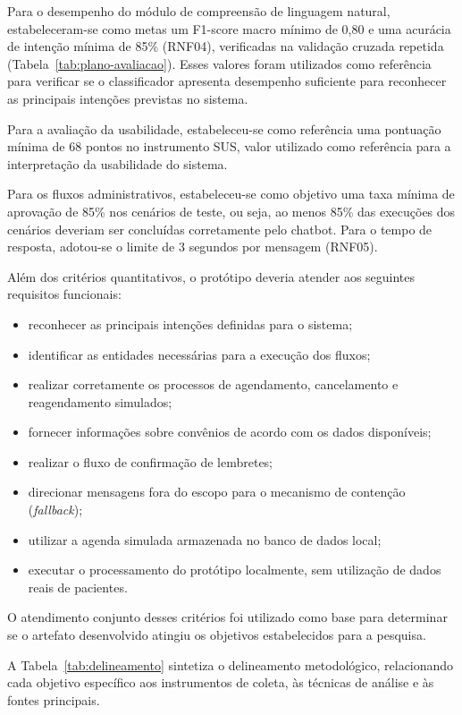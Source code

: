 \documentclass[12pt,a4paper]{extarticle}
\begin{document}
Para o desempenho do módulo de compreensão de linguagem natural, estabeleceram-se como metas um F1-score macro mínimo de 0,80 e uma acurácia de intenção mínima de 85\% (RNF04), verificadas na validação cruzada repetida (Tabela~\ref{tab:plano-avaliacao}). Esses valores foram utilizados como referência para verificar se o classificador apresenta desempenho suficiente para reconhecer as principais intenções previstas no sistema.

Para a avaliação da usabilidade, estabeleceu-se como referência uma pontuação mínima de 68 pontos no instrumento SUS, valor utilizado como referência para a interpretação da usabilidade do sistema.

Para os fluxos administrativos, estabeleceu-se como objetivo uma taxa mínima de aprovação de 85\% nos cenários de teste, ou seja, ao menos 85\% das execuções dos cenários deveriam ser concluídas corretamente pelo chatbot. Para o tempo de resposta, adotou-se o limite de 3 segundos por mensagem (RNF05).

Além dos critérios quantitativos, o protótipo deveria atender aos seguintes requisitos funcionais:

\begin{itemize}
    \item reconhecer as principais intenções definidas para o sistema;
    \item identificar as entidades necessárias para a execução dos fluxos;
    \item realizar corretamente os processos de agendamento, cancelamento e reagendamento simulados;
    \item fornecer informações sobre convênios de acordo com os dados disponíveis;
    \item realizar o fluxo de confirmação de lembretes;
    \item direcionar mensagens fora do escopo para o mecanismo de contenção (\textit{fallback});
    \item utilizar a agenda simulada armazenada no banco de dados local;
    \item executar o processamento do protótipo localmente, sem utilização de dados reais de pacientes.
\end{itemize}

O atendimento conjunto desses critérios foi utilizado como base para determinar se o artefato desenvolvido atingiu os objetivos estabelecidos para a pesquisa.


A Tabela~\ref{tab:delineamento} sintetiza o delineamento metodológico, relacionando cada objetivo específico aos instrumentos de coleta, às técnicas de análise e às fontes principais.
\end{document}
